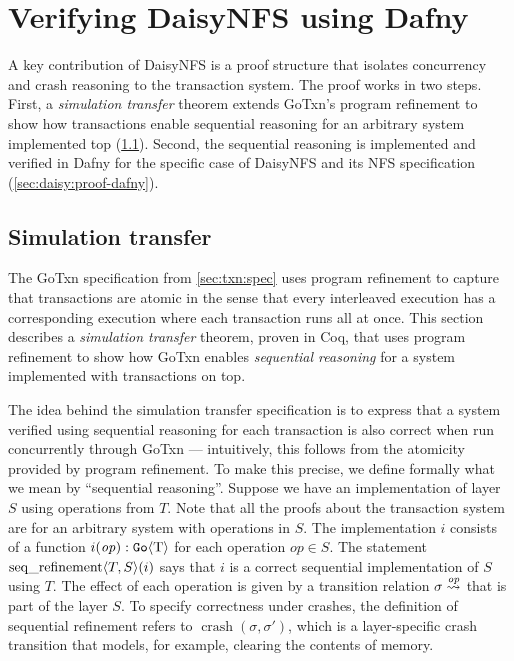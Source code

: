 \section{Verifying DaisyNFS using Dafny}
\label{sec:daisy:proof}

A key contribution of DaisyNFS is a proof structure that isolates concurrency and crash
reasoning to the transaction system. The proof works in two steps. First, a
\emph{simulation transfer} theorem extends GoTxn's program refinement to show
how transactions enable sequential reasoning for an arbitrary system implemented
top (\cref{sec:daisy:simulation-transfer}). Second, the sequential reasoning
is implemented and verified in Dafny for the specific case of DaisyNFS and its
NFS specification (\cref{sec:daisy:proof-dafny}).

\subsection{Simulation transfer}%
\label{sec:daisy:simulation-transfer}

The GoTxn specification from \cref{sec:txn:spec} uses program refinement to
capture that transactions are atomic in the sense that every interleaved
execution has a corresponding execution where each transaction runs all at once.
This section describes a \emph{simulation transfer} theorem, proven in Coq, that
uses program refinement to show how GoTxn enables \emph{sequential
reasoning} for a system implemented with transactions on top.

The idea behind the simulation transfer specification is to express that a system
verified using sequential reasoning for each transaction is also correct when
run concurrently through GoTxn --- intuitively, this follows from the atomicity
provided by program refinement.
To make this precise, we define formally what we mean by
``sequential reasoning''. Suppose we have an
implementation of layer $S$ using operations from $T$. Note that all the proofs
about the transaction system are for an arbitrary system with operations in $S$. The implementation $i$
consists of a function $i(\mathit{op}) : \mathtt{Go}\langle \mathrm{T} \rangle$ for each operation $op \in S$. The statement
$\operatorname{seq\_refinement} \langle T, S \rangle(i)$ says that $i$ is a correct sequential
implementation of $S$ using $T$. The effect of each operation is given by a
transition relation $\sigma \overset{\mathit{op}}{\leadsto}$ that is part of the layer
$S$. To specify correctness under crashes, the
definition of sequential refinement refers to $\operatorname{crash}(\sigma, \sigma')$, which is a
layer-specific crash transition that models, for example, clearing the
contents of memory.

